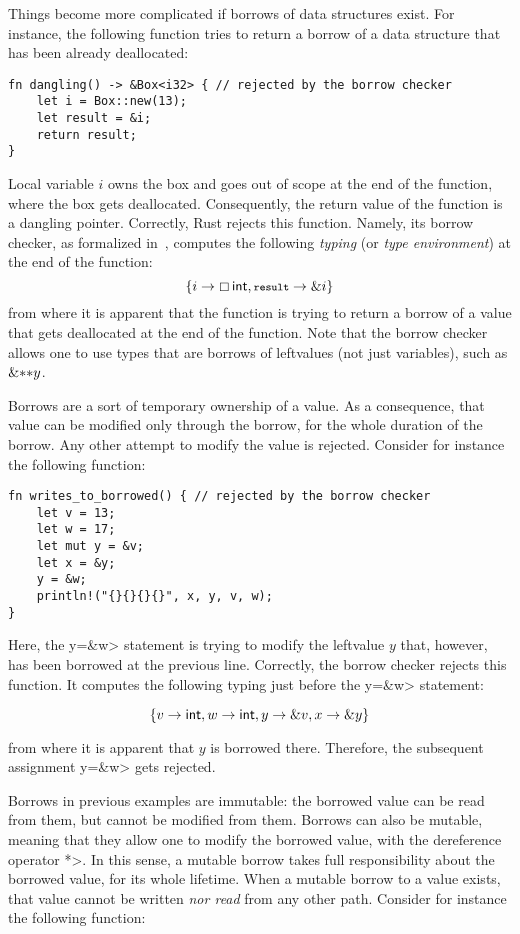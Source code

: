 Things become more complicated if borrows of data structures exist.
For instance, the following function tries to return a borrow of
a data structure that has been already deallocated:

\begin{verbatim}
fn dangling() -> &Box<i32> { // rejected by the borrow checker
    let i = Box::new(13);
    let result = &i;
    return result;
}
\end{verbatim}

\noindent
Local variable $i$ owns the box and goes out of scope at the end of the
function, where the box gets deallocated. Consequently, the return value of
the function is a dangling pointer. Correctly, Rust rejects this function.
Namely, its borrow checker, as formalized in~\cite{Pearce21}, computes the
following \emph{typing} (or \emph{type environment}) at the end of the function:
\[
\{i\to\boxtype{\mathsf{int},\<result>\to\borrow i}\}
\]
from where it is apparent that the function is trying to return a borrow
of a value that gets deallocated at the end of the function. Note that the borrow
checker allows one to
use types that are borrows of leftvalues (not just variables),
such as $\&\mathtt{**}y$.

Borrows are a sort of temporary ownership of a value. As a consequence,
that value can be modified only through the borrow, for the whole
duration of the borrow. Any other attempt to modify the value is rejected.
Consider for instance the following function:

\begin{verbatim}
fn writes_to_borrowed() { // rejected by the borrow checker
    let v = 13;
    let w = 17;
    let mut y = &v;
    let x = &y;
    y = &w;
    println!("{}{}{}{}", x, y, v, w);
}
\end{verbatim}

\noindent
Here, the \<y=\&w> statement is trying to modify the leftvalue $y$
that, however, has been borrowed at the previous line. Correctly, the borrow
checker rejects this function. It computes the following typing
just before the \<y=\&w> statement:

\[
\{v\to\mathsf{int},w\to\mathsf{int},y\to\& v,x\to\& y\}
\]

\noindent
from where it is apparent that $y$ is borrowed there. Therefore,
the subsequent assignment \<y=\&w> gets rejected.

Borrows in previous examples are immutable: the borrowed value can be read
from them, but cannot be modified from them.
Borrows can also be mutable, meaning that they allow one to modify the
borrowed value, with the dereference operator \<*>. In this sense,
a mutable borrow takes full responsibility about the borrowed value, for its
whole lifetime. When a mutable borrow to a value exists, that value cannot
be written \emph{nor read} from any other path. Consider for instance
the following function:

